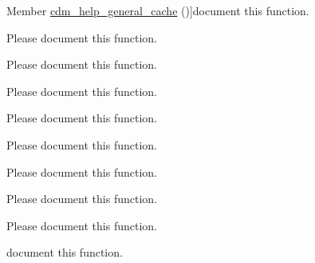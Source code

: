 \begin{DoxyRefList}
\hypertarget{todo__todo000041}{}%
Member \hyperlink{settings_8php_a8b8883e7f2174714bd52dea3cc88abd3}{cdm\-\_\-help\-\_\-general\-\_\-cache} ()]document this function.  
\item[\label{todo__todo000073}%
\hypertarget{todo__todo000073}{}%
Member \hyperlink{cdm__api_8module_a10336309af9e9112c8a6d852dc3c3de2}{cdm\-\_\-load\-\_\-obj} (\$datastr)]Please document this function.  
\item[\label{todo__todo000087}%
\hypertarget{todo__todo000087}{}%
Member \hyperlink{cdm__mediauri_8module_ab6d1d859993ec544bc33aad76e3b49a5}{cdm\-\_\-mediauri\-\_\-rule\-\_\-add\-\_\-submit} (\$form, \&\$form\-\_\-state)]Please document this function.  
\item[\label{todo__todo000089}%
\hypertarget{todo__todo000089}{}%
Member \hyperlink{cdm__mediauri_8module_a2da31aa84de56277247fa9affb3005cb}{cdm\-\_\-mediauri\-\_\-rule\-\_\-delete\-\_\-submit} (\$form, \&\$form\-\_\-state)]Please document this function.  
\item[\label{todo__todo000086}%
\hypertarget{todo__todo000086}{}%
Member \hyperlink{cdm__mediauri_8module_af92efba927fc0052a23bce6e1a61726e}{cdm\-\_\-mediauri\-\_\-rule\-\_\-edit} (\$form, \&\$form\-\_\-state)]Please document this function.  
\item[\label{todo__todo000090}%
\hypertarget{todo__todo000090}{}%
Member \hyperlink{cdm__mediauri_8module_a55e64c614658f5846e8655e9eae4ed86}{cdm\-\_\-mediauri\-\_\-rule\-\_\-edit\-\_\-form} (\$rid= 'new')]Please document this function.  
\item[\label{todo__todo000088}%
\hypertarget{todo__todo000088}{}%
Member \hyperlink{cdm__mediauri_8module_ad216e921909e40bc05b379685743b8fd}{cdm\-\_\-mediauri\-\_\-rule\-\_\-edit\-\_\-submit} (\$form, \&\$form\-\_\-state)]Please document this function.  
\item[\label{todo__todo000091}%
\hypertarget{todo__todo000091}{}%
Member \hyperlink{cdm__mediauri_8module_a938c537e0b3e48f9fe83606b2a6a4800}{cdm\-\_\-mediauri\-\_\-rules} (\$default=F\-A\-L\-S\-E)]Please document this function.  
\item[\label{todo__todo000092}%
\hypertarget{todo__todo000092}{}%
Member \hyperlink{cdm__mediauri_8module_ad65acdec2eef70a324cbc0334223273f}{cdm\-\_\-mediauri\-\_\-view\-\_\-embed} (\$uri)]Please document this function.  
\item[\label{todo__todo000084}%
\hypertarget{todo__todo000084}{}%
Member \hyperlink{cdm__node_8php_a754dd1fc2dfc0085b5cce7cdf1164ba1}{cdm\-\_\-node\-\_\-show} (\$cdm\-\_\-node\-\_\-type, \$uuid, \$title, \$content)]document this function.  

\end{DoxyRefList}
